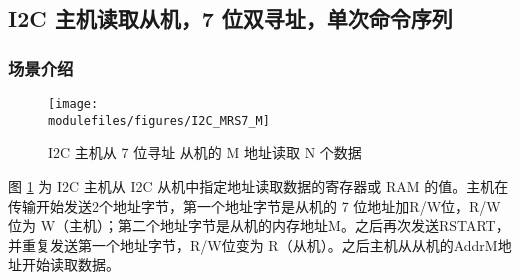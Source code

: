 \documentclass[main\_\_CN.tex]{subfiles}
\begin{document}
\subsection{I2C 主机读取从机，7 位双寻址，单次命令序列}
\subsubsection{场景介绍}
\begin{figure}[H]
    \centering
    \texttt{[image: \\modulefiles/figures/I2C\_MRS7\_M]}
    \caption{I2C 主机从 7 位寻址 从机的 M 地址读取 N 个数据}
    \label{fig:i2c-mrs7-m}
\end{figure}

图 \ref{fig:i2c-mrs7-m} 为 I2C 主机从 I2C 从机中指定地址读取数据的寄存器或 RAM 的值。主机在传输开始发送2个地址字节，第一个地址字节是从机的 7 位地址加R/W位，R/W位为 W（主机）；第二个地址字节是从机的内存地址M。之后再次发送RSTART，并重复发送第一个地址字节，R/W位变为 R（从机）。之后主机从从机的AddrM地址开始读取数据。
\end{document}
